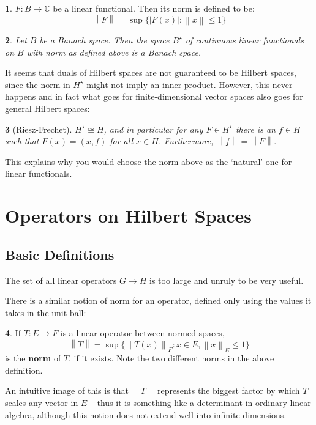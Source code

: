 \documentclass[oneside,english]{amsbook}
\numberwithin{section}{chapter}
\theoremstyle{plain}
\newtheorem{thm}{\protect\theoremname}
\theoremstyle{definition}
\newtheorem{defn}[thm]{\protect\definitionname}
\newcommand{\norm}[1]{\left\lVert#1\right\rVert}
\providecommand{\definitionname}{Definition}
\providecommand{\theoremname}{Theorem}
\begin{document}
\begin{defn}
	$F:B\to \mathbb{C}$ be a linear functional. Then its norm is defined to be:
	\[
	\norm{F} = \sup\{|F(x)| : \norm{x}\le 1\}
	\]
\end{defn}

\begin{thm}
	Let $B$ be a Banach space. Then the space $B^\star$ of continuous linear functionals on $B$ with norm as defined above is a Banach space.
\end{thm}

It seems that duals of Hilbert spaces are not guaranteed to be Hilbert spaces, since the norm in $H^\star$ might not imply an inner product. However, this never happens and in fact what goes for finite-dimensional vector spaces also goes for general Hilbert spaces:

\begin{thm}[Riesz-Frechet]
	$H^\star\cong H$, and in particular for any $F\in H^\star$ there is an $f\in H$ such that $F(x) = (x, f)$ for all $x\in H$. Furthermore, $\norm{f} = \norm{F}$.
\end{thm}

This explains why you would choose the norm above as the `natural' one for linear functionals.

\section{Operators on Hilbert Spaces}

\subsection{Basic Definitions}
The set of all linear operators $G\to H$ is too large and unruly to be very useful. 

There is a similar notion of norm for an operator, defined only using the values it takes in the unit ball:
\begin{defn}
	If $T: E\to F$ is a linear operator between normed spaces, 
	\[
		\norm{T} = \sup\{\norm{T(x)}_F : x\in E, \norm{x}_E\le 1\}
	\]
	is the \textbf{norm} of $T$, if it exists. Note the two different norms in the above definition.
\end{defn}

An intuitive image of this is that $\norm{T}$ represents the biggest factor by which $T$ scales any vector in $E$ -- thus it is something like a determinant in ordinary linear algebra, although this notion does not extend well into infinite dimensions. 
\end{document}

